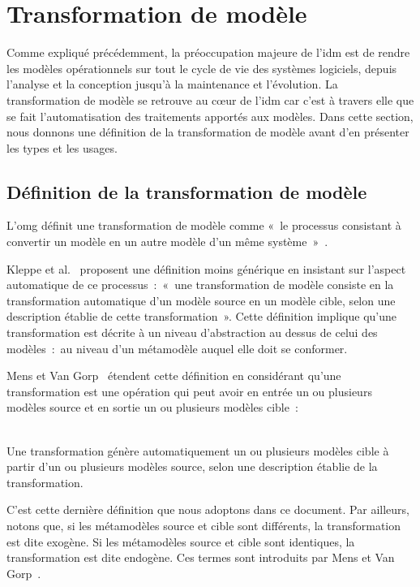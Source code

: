 \section{Transformation de modèle}
\label{sec:transfo_idm}
Comme expliqué précédemment, la préoccupation majeure de l'\gls{idm} est de 
rendre les modèles opérationnels sur tout le cycle de vie des systèmes 
logiciels, depuis l'analyse et la conception jusqu'à la maintenance et 
l'évolution. La transformation de modèle se retrouve au cœur de l'\gls{idm} car 
c'est à travers elle que se fait l'automatisation des traitements apportés aux 
modèles. Dans cette section, nous donnons une définition de la 
transformation de modèle avant d'en présenter les types et les usages.

\subsection{Définition de la transformation de modèle}
L'\gls{omg} définit une transformation de modèle comme «~le processus consistant à 
convertir un modèle en un autre modèle d'un même système~»~\cite{omg2011meta}. 

Kleppe et al.~\cite{kleppe2003mda} proposent une définition moins générique en insistant sur l'aspect automatique de ce processus~:~«~une transformation de modèle 
consiste en la transformation automatique d'un modèle source en un modèle cible, 
selon une description établie de cette transformation~». Cette définition 
implique qu'une transformation est décrite à un niveau 
d'abstraction au dessus de celui des modèles~:~au niveau d'un métamodèle auquel elle doit se conformer. 

Mens et Van Gorp~\cite{mens2006taxonomy} étendent cette définition en considérant qu'une 
transformation est une opération qui peut avoir en entrée un ou plusieurs 
modèles source et en sortie un ou plusieurs modèles cible~: 
\\\

\begin{definition}
Une transformation génère automatiquement un ou plusieurs modèles cible à partir 
d'un ou plusieurs modèles source, selon une description établie de la 
transformation. 
\end{definition}

C'est cette dernière définition que nous adoptons dans ce document. Par 
ailleurs, notons que, si les métamodèles source et cible sont différents, la 
transformation est dite exogène. Si les métamodèles source et cible 
sont identiques, la transformation est dite endogène. Ces 
termes sont introduits par Mens et Van Gorp~\cite{mens2006taxonomy}.


